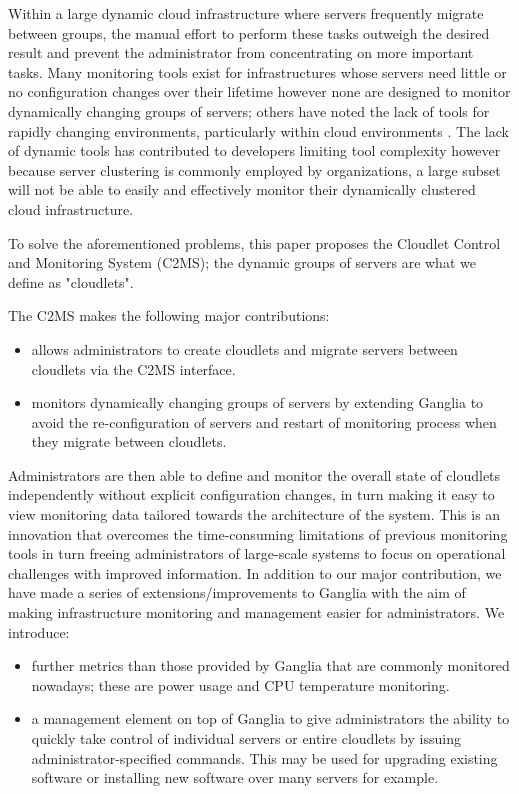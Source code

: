 \documentclass[10pt, conference, compsocconf]{IEEEtran}
\begin{document}
\noindent Within a large dynamic cloud infrastructure where servers frequently migrate between groups, the manual effort to perform these tasks outweigh the desired result and prevent the administrator from concentrating on more important tasks. Many monitoring tools exist for infrastructures whose servers need little or no configuration changes over their lifetime however none are designed to monitor dynamically changing groups of servers; others have noted the lack of tools for rapidly changing environments, particularly within cloud environments \cite{M.Lindner2010} \cite{Ward2012}. The lack of dynamic tools has contributed to developers limiting tool complexity however because server clustering is commonly employed by organizations, a large subset will not be able to easily and effectively monitor their dynamically clustered cloud infrastructure. 

To solve the aforementioned problems, this paper proposes the Cloudlet Control and Monitoring System (C2MS); the dynamic groups of servers are what we define as "cloudlets".  

The C2MS makes the following major contributions: 

\begin{itemize}
\item allows administrators to create cloudlets and migrate servers between cloudlets via the C2MS interface.
\item monitors dynamically changing groups of servers by extending Ganglia \cite{ganglia}\cite{wide_area_ganglia} \cite{Massie2012} to avoid the re-configuration of servers and restart of monitoring process when they migrate between cloudlets. 
\end{itemize}

\noindent Administrators are then able to define and monitor the overall state of cloudlets independently without explicit configuration changes, in turn making it easy to view monitoring data tailored towards the architecture of the system. This is an innovation that overcomes the time-consuming limitations of previous monitoring tools in turn freeing administrators of large-scale systems to focus on operational challenges with improved information. In addition to our major contribution, we have made a series of extensions/improvements to Ganglia with the aim of making infrastructure monitoring and management easier for administrators. We introduce:

\begin{itemize}
\item further metrics than those provided by Ganglia that are commonly monitored nowadays; these are power usage and CPU temperature monitoring.
\item a management element on top of Ganglia to give administrators the ability to quickly take control of individual servers or entire cloudlets by issuing administrator-specified commands. This may be used for upgrading existing software or installing new software over many servers for example.
\end{itemize}
\end{document}
